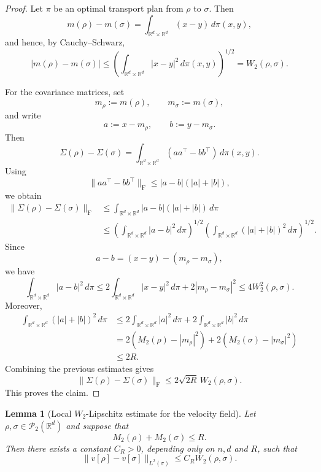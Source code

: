 \documentclass[11pt,reqno]{amsart}
\numberwithin{figure}{section}
\newcommand{\bbr}{\mathbb R}
\newcommand{\dm}{d}
\newtheorem{lemma}{Lemma}[section]
\begin{document}
\begin{proof}
Let $\pi$ be an optimal transport plan from $\rho$ to $\sigma$. Then
\[
m(\rho)-m(\sigma)
=
\int_{\mathbb R^d\times\mathbb R^d}(x-y)\,d\pi(x,y),
\]
and hence, by Cauchy--Schwarz,
\[
|m(\rho)-m(\sigma)|
\le
\left(\int_{\mathbb R^d\times\mathbb R^d}|x-y|^2\,d\pi(x,y)\right)^{1/2}
=
W_2(\rho,\sigma).
\]

For the covariance matrices, set
\[
m_\rho:=m(\rho),\qquad m_\sigma:=m(\sigma),
\]
and write
\[
a:=x-m_\rho,\qquad b:=y-m_\sigma.
\]
Then
\[
\Sigma(\rho)-\Sigma(\sigma)
=
\int_{\mathbb R^d\times\mathbb R^d}
\left(aa^\top-bb^\top\right)\,d\pi(x,y).
\]
Using
\[
\|aa^\top-bb^\top\|_{\mathrm F}
\le
|a-b|(|a|+|b|),
\]
we obtain
\[
\begin{aligned}
\|\Sigma(\rho)-\Sigma(\sigma)\|_{\mathrm F}
&\le
\int_{\bbr^\dm\times\bbr^\dm} |a-b|(|a|+|b|)\,d\pi  \\
&\le
\left(\int_{\bbr^\dm\times\bbr^\dm} |a-b|^2\,d\pi\right)^{1/2}
\left(\int_{\bbr^\dm\times\bbr^\dm} (|a|+|b|)^2\,d\pi\right)^{1/2}.
\end{aligned}
\]
Since
\[
a-b=(x-y)-(m_\rho-m_\sigma),
\]
we have
\[
\int_{\bbr^\dm\times\bbr^\dm} |a-b|^2\,d\pi
\le
2\int_{\bbr^\dm\times\bbr^\dm} |x-y|^2\,d\pi
+
2|m_\rho-m_\sigma|^2
\le
4W_2^2(\rho,\sigma).
\]
Moreover,
\begin{align*}
\int_{\bbr^\dm\times\bbr^\dm} (|a|+|b|)^2\,d\pi
&\le
2\int_{\bbr^\dm\times\bbr^\dm} |a|^2\,d\pi
+
2\int_{\bbr^\dm\times\bbr^\dm} |b|^2\,d\pi\\
&=
2(M_2(\rho)-|m_\rho|^2)
+
2(M_2(\sigma)-|m_\sigma|^2)\\
&\le 2R.
\end{align*}
Combining the previous estimates gives
\[
\|\Sigma(\rho)-\Sigma(\sigma)\|_{\mathrm F}
\le
2\sqrt{2R}\,W_2(\rho,\sigma).
\]
This proves the claim.
\end{proof}

\begin{lemma}[Local $W_2$-Lipschitz estimate for the velocity field]
\label{lem:velocity-W2-lipschitz-P2}
Let $\rho,\sigma\in\mathcal P_2(\mathbb R^d)$ and suppose that
\[
M_2(\rho)+M_2(\sigma)\le R.
\]
Then there exists a constant $C_R>0$, depending only on $n,d$ and $R$, such that
\[
\|v[\rho]-v[\sigma]\|_{L^2(\sigma)}
\le
C_R W_2(\rho,\sigma).
\]
\end{lemma}
\end{document}
